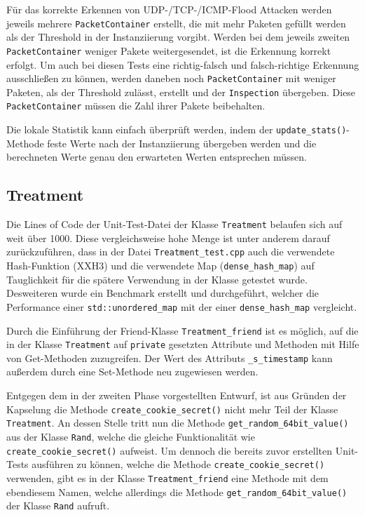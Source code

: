 \documentclass[../review_3.tex]{subfiles}
\begin{document}
Für das korrekte Erkennen von UDP-/TCP-/ICMP-Flood Attacken werden jeweils mehrere \texttt{PacketContainer} erstellt, die mit mehr Paketen gefüllt werden als der Threshold in der Instanziierung vorgibt. Werden bei dem jeweils zweiten \texttt{PacketContainer} weniger Pakete weitergesendet, ist die Erkennung korrekt erfolgt. Um auch bei diesen Tests eine richtig-falsch und falsch-richtige Erkennung ausschließen zu können, werden daneben noch \texttt{PacketContainer} mit weniger Paketen, als der Threshold zulässt, erstellt und der \texttt{Inspection} übergeben. Diese \texttt{PacketContainer} müssen die Zahl ihrer Pakete beibehalten.

Die lokale Statistik kann einfach überprüft werden, indem der \texttt{update\_stats()}-Methode feste Werte nach der Instanziierung übergeben werden und die berechneten Werte genau den erwarteten Werten entsprechen müssen.

\subsection{Treatment}
Die Lines of Code der Unit-Test-Datei der Klasse \texttt{Treatment} belaufen sich auf weit über 1000. Diese vergleichsweise hohe Menge ist unter anderem darauf zurückzuführen, dass in der Datei \texttt{Treatment\_test.cpp} auch die verwendete Hash-Funktion (XXH3) und die verwendete Map (\texttt{dense\_hash\_map}) auf Tauglichkeit für die spätere Verwendung in der Klasse getestet wurde. Desweiteren wurde ein Benchmark erstellt und durchgeführt, welcher die Performance einer \texttt{std::unordered\_map} mit der einer \texttt{dense\_hash\_map} vergleicht.

Durch die Einführung der Friend-Klasse \texttt{Treatment\_friend} ist es möglich, auf die in der Klasse \texttt{Treatment} auf \texttt{private} gesetzten Attribute und Methoden mit Hilfe von Get-Methoden zuzugreifen. Der Wert des Attributs \texttt{\_s\_timestamp} kann außerdem durch eine Set-Methode neu zugewiesen werden.

Entgegen dem in der zweiten Phase vorgestellten Entwurf, ist aus Gründen der Kapselung die Methode \texttt{create\_cookie\_secret()}  nicht mehr Teil der Klasse \texttt{Treatment}. An dessen Stelle tritt nun die Methode \texttt{get\_random\_64bit\_value()} aus der Klasse \texttt{Rand}, welche die gleiche Funktionalität wie \texttt{create\_cookie\_secret()} aufweist. Um dennoch die bereits zuvor erstellten Unit-Tests ausführen zu können, welche die Methode \texttt{create\_cookie\_secret()} verwenden, gibt es in der Klasse \texttt{Treatment\_friend} eine Methode mit dem ebendiesem Namen, welche allerdings die Methode \texttt{get\_random\_64bit\_value()} der Klasse \texttt{Rand} aufruft.
\end{document}
